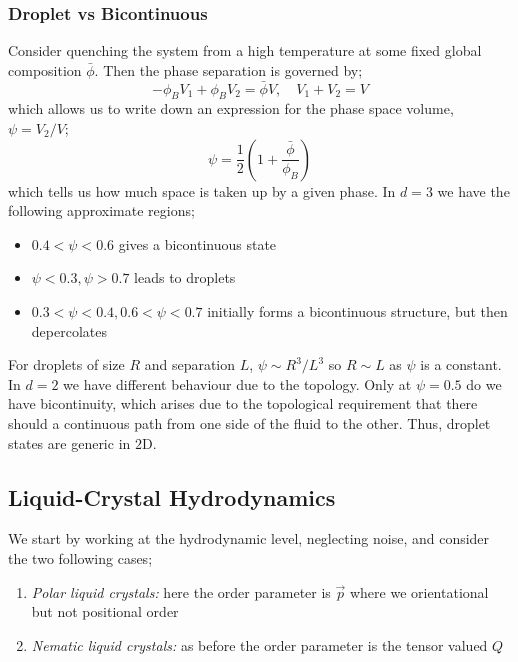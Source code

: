 \subsubsection*{Droplet vs Bicontinuous}
Consider quenching the system from a high temperature at some fixed global composition $\bar{\phi}$. Then the phase separation is governed by;
\begin{equation*}
-\phi_B V_1 + \phi_B V_2 = \bar{\phi}V, \quad V_1 + V_2 = V
\end{equation*}
which allows us to write down an expression for the phase space volume, $\psi = V_2 / V$;
\begin{equation}
\psi = \frac{1}{2}\left(1 + \frac{\bar{\phi}}{\phi_B}\right)
\end{equation}
which tells us how much space is taken up by a given phase. In $d = 3$ we have the following approximate regions;
\begin{itemize}
\item $0.4 < \psi < 0.6$ gives a bicontinuous state
\item $\psi < 0.3, \psi > 0.7$ leads to droplets
\item $0.3 < \psi < 0.4, 0.6 < \psi < 0.7$ initially forms a bicontinuous structure, but then depercolates
\end{itemize}
For droplets of size $R$ and separation $L$, $\psi \sim R^3 / L^3$ so $R \sim L$ as $\psi$ is a constant. In $d = 2$ we have different behaviour due to the topology. Only at $\psi = 0.5$ do we have bicontinuity, which arises due to the topological requirement that there should a continuous path from one side of the fluid to the other. Thus, droplet states are generic in $2$D.
\subsection{Liquid-Crystal Hydrodynamics}
We start by working at the hydrodynamic level, neglecting noise, and consider the two following cases;
\begin{enumerate}
\item \emph{Polar liquid crystals:} here the order parameter is $\vec{p}$ where we orientational but not positional order
\item \emph{Nematic liquid crystals:} as before the order parameter is the tensor valued $Q$
\end{enumerate}
